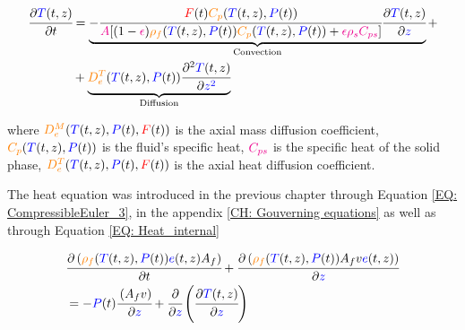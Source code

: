 \documentclass[../Article_Model_Parameters.tex]{subfiles}
\begin{document}
			{\footnotesize
				\begin{equation} \label{Model_heat}
					\begin{split}
						\cfrac{\partial {\color{blue}T}(t,z)}{\partial t} &= 
						\underbrace{ -\cfrac{{\color{red}F}(t) {\color{orange}C_p}({\color{blue}T}(t,z),{\color{blue}P}(t))}{{\color{magenta}A} 	[(1-{\color{magenta}\epsilon}){\color{orange}\rho_f}({\color{blue}T}(t,z),{\color{blue}P}(t)) {\color{orange}C_p} ({\color{blue}T}(t,z),{\color{blue}P}(t)) + {\color{magenta} \epsilon \rho_s C_{ps} } ]} \cfrac{\partial {\color{blue}T}(t,z)}{\partial {\color{blue}z}}  }_{\text{Convection}} + \\
						& + \underbrace{ {\color{orange}D^T_e}({\color{blue}T}(t,z),{\color{blue}P}(t)) \cfrac{\partial^2 {\color{blue}T}(t,z)}{\partial {\color{blue}z^2}} }_{\text{Diffusion}}
					\end{split}
			\end{equation} }
			
		where $ {\color{orange}D^M_e}({\color{blue}T}(t,z),{\color{blue}P}(t),{\color{red}F}(t))$ is the axial mass diffusion coefficient, ${\color{orange}C_p}({\color{blue}T}(t,z),{\color{blue}P}(t))$ is the fluid's specific heat, ${\color{magenta}C_{ps}}$ is the specific heat of the solid phase, ${\color{orange}D^T_e}({\color{blue}T}(t,z),{\color{blue}P}(t),{\color{red}F}(t))$ is the axial heat diffusion coefficient. 

		\fi
		
			The heat equation was introduced in the previous chapter through Equation \ref{EQ: CompressibleEuler_3}, in the appendix \ref{CH: Gouverning equations}  as well as through Equation \ref{EQ: Heat_internal}
			
			{\footnotesize
			\begin{align} \label{EQ: Heat_internal}
				&\cfrac{\partial \left( {\color{orange}\rho_f}({\color{blue}T}(t,z),{\color{blue}P}(t)) {\color{blue}e}(t,z) A_f \right) }{\partial t} + \cfrac{\partial \left( {\color{orange}\rho_f}({\color{blue}T}(t,z),{\color{blue}P}(t)) A_f v {\color{blue}e}(t,z) \right)}{\partial {\color{blue}z}} \nonumber \\
				&= -{\color{blue}P}(t)\cfrac{\left( A_f v \right)}{\partial {\color{blue}z}} + \cfrac{\partial}{\partial {\color{blue}z}} \left( \cfrac{\partial {\color{blue}T}(t,z)}{\partial {\color{blue}z}} \right) 
			\end{align}
			}
		
\end{document}
